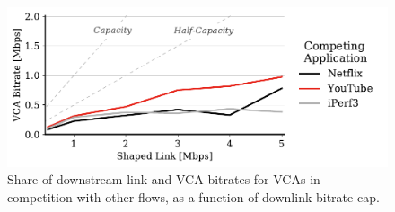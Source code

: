 \begin{figure}[t]
    \centering
    \includegraphics[width=\linewidth]{figures/comp/dl_competition_teams_app.pdf}
    \caption{Share of downstream link and VCA bitrates for VCAs in competition with other flows, as a function of downlink bitrate cap.}
	\label{fig:comp_bitrates_dl}
\end{figure}

